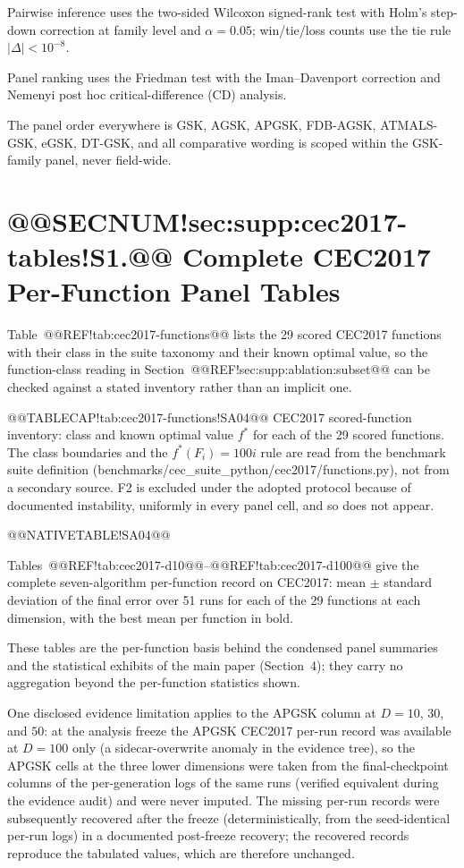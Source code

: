 \documentclass[10pt,a4paper]{article}
\newcommand{\dtgsk}{DT-GSK}
\newcommand{\atmals}{ATMALS-GSK}
\newcommand{\agsk}{AGSK}
\newcommand{\apgsk}{APGSK}
\newcommand{\fdbagsk}{FDB-AGSK}
\newcommand{\egsk}{eGSK}
\begin{document}
Pairwise inference uses the two-sided Wilcoxon signed-rank
test with Holm's step-down
correction at family level and $\alpha = 0.05$;
win/tie/loss counts use the tie rule $|\Delta| < 10^{-8}$.

Panel ranking uses the Friedman test with the
Iman--Davenport correction and Nemenyi post hoc critical-difference (CD)
analysis.

The panel order everywhere is GSK, \agsk{}, \apgsk{}, \fdbagsk{},
\atmals{}, \egsk{}, \dtgsk{}, and all comparative wording is scoped
within the GSK-family panel, never field-wide.


\section{@@SECNUM!sec:supp:cec2017-tables!S1.@@ Complete CEC2017 Per-Function Panel Tables}\label{sec:supp:cec2017-tables}


Table~@@REF!tab:cec2017-functions@@ lists the 29 scored CEC2017 functions with
their class in the suite taxonomy and their known optimal value, so the
function-class reading in Section~@@REF!sec:supp:ablation:subset@@ can be checked
against a stated inventory rather than an implicit one.



@@TABLECAP!tab:cec2017-functions!SA04@@ CEC2017 scored-function inventory: class and known optimal value
$f^{*}$ for each of the 29 scored functions. The class boundaries and the
$f^{*}(F_{i}) = 100i$ rule are read from the benchmark suite definition
(benchmarks/cec\_suite\_python/cec2017/functions.py), not from a
secondary source. F2 is excluded under the adopted protocol because of
documented instability, uniformly in every panel cell, and so does not
appear.

@@NATIVETABLE!SA04@@



Tables~@@REF!tab:cec2017-d10@@--@@REF!tab:cec2017-d100@@ give the complete
seven-algorithm per-function record on CEC2017: mean $\pm$ standard deviation
of the final error over 51 runs for each of the 29 functions at each
dimension, with the best mean per function in bold.

These tables are the per-function basis behind the condensed panel
summaries and the statistical exhibits of the main paper (Section~4);
they carry no aggregation beyond the per-function statistics shown.

One disclosed evidence limitation applies to the \apgsk{} column at
$D = 10$, $30$, and $50$: at the analysis freeze the \apgsk{} CEC2017
per-run record was available at $D = 100$ only (a sidecar-overwrite
anomaly in the evidence tree), so the \apgsk{} cells at the three lower
dimensions were taken from the final-checkpoint columns of the
per-generation logs of the same runs (verified equivalent during the
evidence audit) and were never imputed. The missing per-run records
were subsequently recovered after the freeze (deterministically,
from the seed-identical per-run logs) in a documented post-freeze recovery;
the recovered records reproduce the tabulated values, which are
therefore unchanged.
\end{document}

